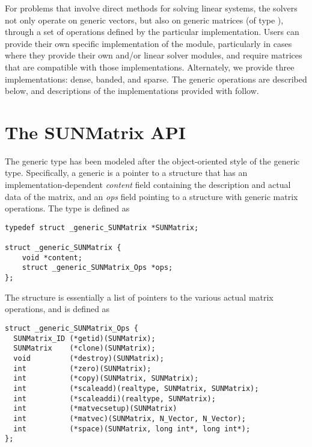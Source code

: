 %
For problems that involve direct methods for solving linear systems,
the {\sundials} solvers not only operate on generic vectors, but also
on generic matrices (of type ), through a set of
operations defined by the particular {\sunmatrix} implementation.
Users can provide their own specific implementation of the
{\sunmatrix} module, particularly in cases where they provide their
own {\nvector} and/or linear solver modules, and require matrices that
are compatible with those implementations.  Alternately, we provide three
{\sunmatrix} implementations: dense, banded, and sparse.  The
generic operations are described below, and descriptions of the
implementations provided with {\sundials} follow.

\section{The SUNMatrix API}
\label{s:sunmatrix_api}

The generic  type has been modeled after the
object-oriented style of the generic  type.
Specifically, a generic  is a pointer to a structure
that has an implementation-dependent {\em content} field containing
the description and actual data of the matrix, and an {\em ops} field
pointing to a structure with generic matrix operations.
The type  is defined as
\begin{verbatim}
typedef struct _generic_SUNMatrix *SUNMatrix;

struct _generic_SUNMatrix {
    void *content;
    struct _generic_SUNMatrix_Ops *ops;
};
\end{verbatim}
The  structure is essentially a list of pointers to
the various actual matrix operations, and is defined as
\begin{verbatim}
struct _generic_SUNMatrix_Ops {
  SUNMatrix_ID (*getid)(SUNMatrix);
  SUNMatrix    (*clone)(SUNMatrix);
  void         (*destroy)(SUNMatrix);
  int          (*zero)(SUNMatrix);
  int          (*copy)(SUNMatrix, SUNMatrix);
  int          (*scaleadd)(realtype, SUNMatrix, SUNMatrix);
  int          (*scaleaddi)(realtype, SUNMatrix);
  int          (*matvecsetup)(SUNMatrix)
  int          (*matvec)(SUNMatrix, N_Vector, N_Vector);
  int          (*space)(SUNMatrix, long int*, long int*);
};
\end{verbatim}




